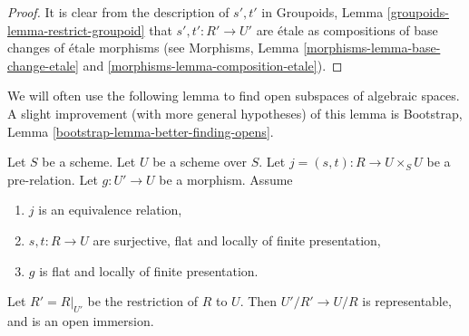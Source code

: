 \begin{proof}
It is clear from the description of $s', t'$ in
Groupoids, Lemma \ref{groupoids-lemma-restrict-groupoid}
that $s' , t' : R' \to U'$ are \'etale
as compositions of base changes of \'etale morphisms
(see Morphisms, Lemma \ref{morphisms-lemma-base-change-etale}
and \ref{morphisms-lemma-composition-etale}).
\end{proof}

\noindent
We will often use the following lemma to find open subspaces of algebraic
spaces. A slight improvement (with more general hypotheses) of this lemma is
Bootstrap, Lemma \ref{bootstrap-lemma-better-finding-opens}.

\begin{lemma}
\label{lemma-finding-opens}
Let $S$ be a scheme.
Let $U$ be a scheme over $S$.
Let $j = (s, t) : R \to U \times_S U$ be a pre-relation.
Let $g : U' \to U$ be a morphism.
Assume
\begin{enumerate}
\item $j$ is an equivalence relation,
\item $s, t : R \to U$ are surjective, flat and
locally of finite presentation,
\item $g$ is flat and locally of finite presentation.
\end{enumerate}
Let $R' = R|_{U'}$ be the restriction of $R$ to $U$. Then
$U'/R' \to U/R$ is representable, and is an open immersion.
\end{lemma}


